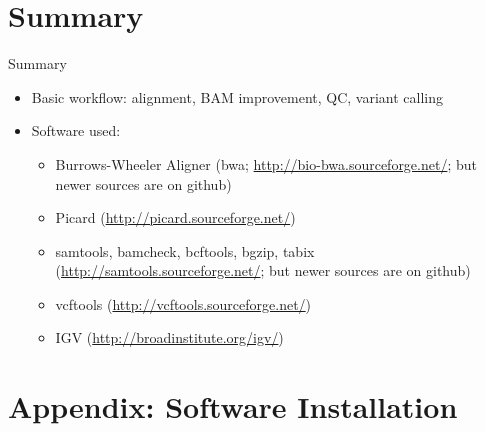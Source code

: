 \documentclass{beamer}
\begin{document}
\section*{Summary}

\begin{frame}{Summary}

  \begin{itemize}
  \item
    Basic workflow: alignment, BAM improvement, QC, variant calling
  \item
    Software used: 
    \begin{itemize}
    \item Burrows-Wheeler Aligner (bwa; \url{http://bio-bwa.sourceforge.net/}; but newer sources are on github)
    \item Picard (\url{http://picard.sourceforge.net/})
    \item samtools, bamcheck, bcftools, bgzip, tabix (\url{http://samtools.sourceforge.net/}; but newer sources are on github)
    \item vcftools (\url{http://vcftools.sourceforge.net/})
    \item IGV (\url{http://broadinstitute.org/igv/})
    \end{itemize}
  \end{itemize}
  
\end{frame}


\section*{Appendix: Software Installation}
\end{document}
